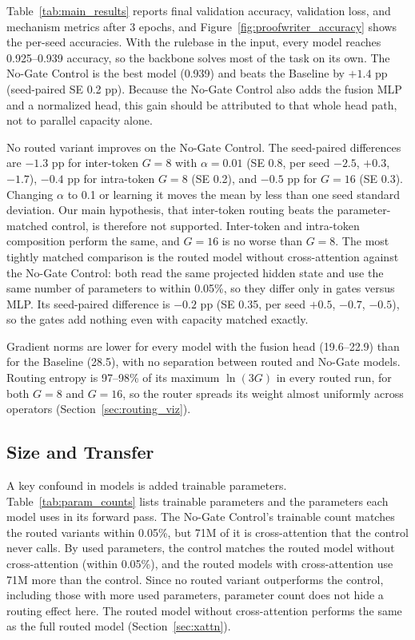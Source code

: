 \documentclass[10pt,twocolumn,letterpaper]{article}
\begin{document}
Table~\ref{tab:main_results} reports final validation accuracy, validation
loss, and mechanism metrics after 3 epochs, and
Figure~\ref{fig:proofwriter_accuracy} shows the per-seed accuracies. With the
rulebase in the input,
every model reaches 0.925--0.939 accuracy, so the backbone solves most of the
task on its own. The No-Gate Control is the best model (0.939) and beats the
Baseline by $+1.4$ pp (seed-paired SE 0.2 pp). Because the No-Gate Control also
adds the fusion MLP and a normalized head, this gain should be attributed to
that whole head path, not to parallel capacity alone.

No routed variant improves on the No-Gate Control. The seed-paired differences
are $-1.3$ pp for inter-token $G=8$ with $\alpha=0.01$ (SE 0.8, per seed
$-2.5$, $+0.3$, $-1.7$), $-0.4$ pp for intra-token $G=8$ (SE 0.2), and
$-0.5$ pp for $G=16$ (SE 0.3). Changing $\alpha$ to 0.1 or learning it moves
the mean by less than one seed standard deviation. Our main hypothesis, that
inter-token routing beats the parameter-matched control, is therefore not
supported. Inter-token and intra-token composition perform the same, and
$G=16$ is no worse than $G=8$. The most tightly matched comparison is the routed
model without cross-attention against the No-Gate Control: both read the same
projected hidden state and use the same number of parameters to within 0.05\%,
so they differ only in gates versus MLP. Its seed-paired difference is
$-0.2$ pp (SE 0.35, per seed $+0.5$, $-0.7$, $-0.5$), so the gates add nothing
even with capacity matched exactly.

Gradient norms are lower for every model with the fusion head (19.6--22.9)
than for the Baseline (28.5), with no separation between routed and No-Gate
models. Routing entropy is 97--98\% of its maximum $\ln(3G)$ in every routed
run, for both $G=8$ and $G=16$, so the router spreads its weight almost
uniformly across operators (Section~\ref{sec:routing_viz}).

\subsection{Size and Transfer}

A key confound in models is added trainable parameters.
Table~\ref{tab:param_counts} lists trainable parameters and the parameters
each model uses in its forward pass. The No-Gate Control's trainable count
matches the routed variants within 0.05\%, but 71M of it is cross-attention
that the control never calls. By used parameters, the control matches the
routed model without cross-attention (within 0.05\%), and the routed models
with cross-attention use 71M more than the control. Since no routed variant
outperforms the control, including those with more used parameters, parameter
count does not hide a routing effect here. The routed model without
cross-attention performs the same as the full routed model
(Section~\ref{sec:xattn}).
\end{document}
